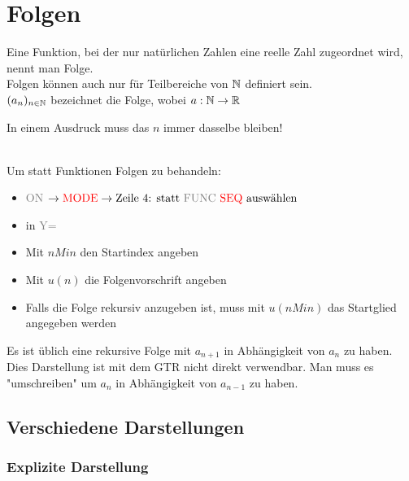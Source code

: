 \chapter{Folgen}



\begin{Definition}
Eine Funktion, bei der nur natürlichen Zahlen eine reelle Zahl zugeordnet wird, nennt man Folge.\\
Folgen können auch nur für Teilbereiche von $\mathbb{N}$ definiert sein.\\
$(a_{n})_{n\in\mathbb{N}}$ bezeichnet die Folge, wobei $a:\mathbb{N}\rightarrow\mathbb{R}$
\end{Definition}

\begin{Bemerkung}
In einem Ausdruck muss das $n$ immer dasselbe bleiben!
\end{Bemerkung}


\begin{GTR-Tipp}
\\
Um statt Funktionen Folgen zu behandeln:
\begin{itemize}
\item\textcolor{gray}{ON} $\rightarrow \textcolor{red}{\text{MODE}} \rightarrow \text{Zeile 4: statt \textcolor{gray}{FUNC} \textcolor{red}{SEQ} auswählen}$
\item in \textcolor{gray}{Y=}
\item Mit $nMin$ den Startindex angeben
\item Mit $u(n)$ die Folgenvorschrift angeben
\item Falls die Folge rekursiv anzugeben ist, muss mit $u(nMin)$ das Startglied angegeben werden
\end{itemize}
\end{GTR-Tipp}

\begin{Bemerkung}
Es ist üblich eine rekursive Folge mit $a_{n+1}$ in Abhängigkeit von $a_n$ zu haben. Dies Darstellung ist mit dem GTR nicht direkt verwendbar. Man muss es "umschreiben" um $a_n$ in Abhängigkeit von $a_{n-1}$ zu haben.
\end{Bemerkung}

		\section{Verschiedene Darstellungen}


	\subsection{Explizite Darstellung}

